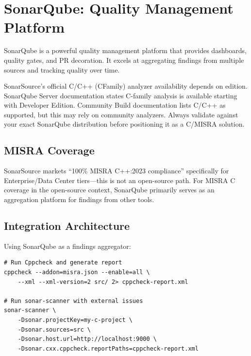 \documentclass[11pt,letterpaper]{report}
\begin{document}
\section{SonarQube: Quality Management Platform}

SonarQube is a powerful quality management platform that provides dashboards, quality gates, and PR decoration. It excels at aggregating findings from multiple sources and tracking quality over time.

\begin{notebox}
SonarSource's official C/C++ (CFamily) analyzer availability depends on edition. SonarQube Server documentation states C-family analysis is available starting with Developer Edition. Community Build documentation lists C/C++ as supported, but this may rely on community analyzers. Always validate against your exact SonarQube distribution before positioning it as a C/MISRA solution.
\end{notebox}

\subsection{MISRA Coverage}

SonarSource markets ``100\% MISRA C++:2023 compliance'' specifically for Enterprise/Data Center tiers---this is not an open-source path. For MISRA C coverage in the open-source context, SonarQube primarily serves as an aggregation platform for findings from other tools.

\subsection{Integration Architecture}

Using SonarQube as a findings aggregator:

\begin{verbatim}
# Run Cppcheck and generate report
cppcheck --addon=misra.json --enable=all \
    --xml --xml-version=2 src/ 2> cppcheck-report.xml

# Run sonar-scanner with external issues
sonar-scanner \
    -Dsonar.projectKey=my-c-project \
    -Dsonar.sources=src \
    -Dsonar.host.url=http://localhost:9000 \
    -Dsonar.cxx.cppcheck.reportPaths=cppcheck-report.xml
\end{verbatim}

\end{document}

